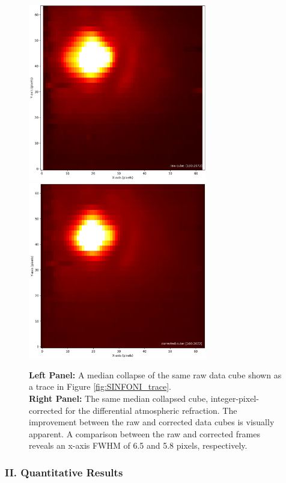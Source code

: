 \begin{figure}[H]
\centering \subfigure
\includegraphics[width=7.8cm]{figures/SINFO_2015-02-18T07_53_Telluric_Standard_COADD_STD_H+K_0_025_full_median_collapsed_cube.png}
\includegraphics[width=7.8cm]{figures/SINFO_2015-02-18T07_53_Telluric_Standard_COADD_STD_H+K_0_025_full_median_corrected_cube.png}
\caption[]
	{\footnotesize  {\bf Left Panel:}  A median collapse of the same raw data cube shown as a trace in Figure \ref{fig:SINFONI_trace}. \\
	{\bf Right Panel:}  The same median collapsed cube, integer-pixel-corrected for the differential atmospheric refraction.   The improvement between the raw 
	and corrected data cubes is visually apparent.  A comparison between the raw and corrected frames reveals an x-axis FWHM of
	6.5 and 5.8 pixels, respectively.
	}
	\label{fig:SINFONI_image}
\end{figure}

\subsubsection{II.  Quantitative Results}

